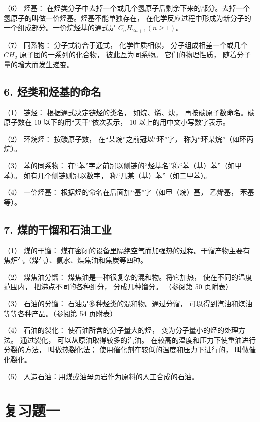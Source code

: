 （6） 烃基：
在烃类分子中去掉一个或几个氢原子后剩余下来的部分。去掉一个氢原子的叫做一价烃基。烃基不能单独存在，
在化学反应过程中形成为新分子的一个组成部分。一价烷烃基的通式是
\(C_{n}H_{2n+1}(n \geqslant 1)\)。

（7） 同系物： 分子式符合于通式， 化学性质相似， 分子组成相差一个或几个
\(CH_{2}\) 原子团的一系列的化合物， 彼此互为同系物。 它们的物理性质，
随着分子量的增大而发生递变。

\subsection{6. 烃类和烃基的命名}

（1） 链烃： 根据通式决定链烃的类名， 如烷、烯、炔，
再按碳原子数命名。碳原子数在 10 以下的用``天干''依次表示， 10
以上的用中文小写数字表示。

（2） 环烷烃： 按碳原子数， 在``某烷''之前冠以``环''字，
称为``环某烷''（如环丙烷）。

（3） 苯的同系物：
在``苯''字之前冠以侧链的``烃基名''称``苯（基）苯''（如甲苯）。
如有几个侧链则冠以数字， 称``几某（基）苯''（如二甲苯）。

（4） 一价烃基： 根据烃的命名在后面加``基''字（如甲（烷）基， 乙烯基，
苯基等）。

\subsection{7. 煤的干馏和石油工业}

（1） 煤的干馏：
煤在密闭的设备里隔绝空气而加强热的过程。干馏产物主要有焦炉气（煤气）、氨水、煤焦油和焦炭等四种。

（2） 煤焦油分馏： 煤焦油是一种很复杂的混和物。将它加热，
使在不同的温度范围内， 把沸点不同的各种组分， 分成几种馏分。 （参阅第 50
页附表）

（3） 石油的分馏： 石油是多种烃类的混和物。通过分馏，
可以得到汽油和煤油等等各种产品。（参阅第 54 页附表）

（4） 石油的裂化： 使石油所含的分子量大的烃，
变为分子量小的烃的处理方法。 通过裂化， 可以从原油取得较多的汽油。
在较高的温度和压力下使重油进行分裂的方法， 叫做热裂化法；
使用催化剂在较低的温度和压力下进行的， 叫做催化裂化。

（5） 人造石油：用煤或油母页岩作为原料的人工合成的石油。

\section{复习题一}

